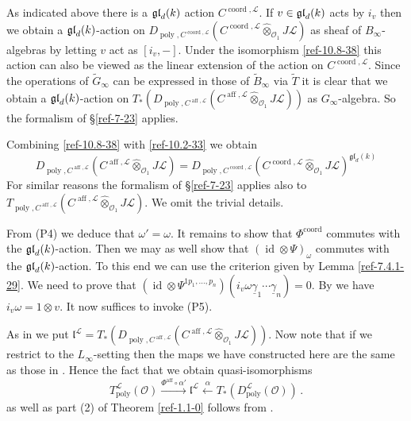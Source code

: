 \documentclass{amsart}
\numberwithin{equation}{section}
\let\cal\mathcal
\theoremstyle{definition}
\theoremstyle{remark}
\begin{document}
As indicated above there is a $\frak{gl}_d(k)$ action
$C^{{\operatorname{coord}},{{\cal L}}}$.  If $v\in \frak{gl}_d(k)$ acts by $i_v$ then we
obtain a $ \frak{gl}_d(k)$-action on $D_{{\operatorname{poly}},C^{{\operatorname{coord}},{{\cal L}}}}
(C^{{\operatorname{coord}},{{\cal L}}}{\mathbin{\hat{\otimes}}}_{{{\cal O}}_1} J{{\cal L}})$ as sheaf of
$B_\infty$-algebras by letting $v$ act as $[i_v,-]$. Under the
isomorphism \eqref{ref-10.8-38} this action can also be viewed as the
linear extension of the action on $C^{{\operatorname{coord}},{{\cal L}}}$.  Since the
operations of $\widetilde{G}_\infty$ can be expressed in those of
$\widetilde{B}_\infty$ via $\tilde{T}$ it is clear that we obtain a $
\frak{gl}_d(k)$-action on $ T_\ast(D_{{\operatorname{poly}},C^{{\operatorname{aff}},{{\cal L}}}}
(C^{{\operatorname{aff}},{{\cal L}}}{\mathbin{\hat{\otimes}}}_{{{\cal O}}_1} J{{\cal L}}))$ as $G_\infty$-algebra.  So
the formalism of \S\ref{ref-7-23} applies.

Combining \eqref{ref-10.8-38} with \eqref{ref-10.2-33} we obtain
\[
D_{{\operatorname{poly}},C^{{\operatorname{aff}},{{\cal L}}}} (C^{{\operatorname{aff}},{{\cal L}}}{\mathbin{\hat{\otimes}}}_{{{\cal O}}_1} J{{\cal L}})=
D_{{\operatorname{poly}},C^{{\operatorname{coord}},{{\cal L}}}} (C^{{\operatorname{coord}},{{\cal L}}}{\mathbin{\hat{\otimes}}}_{{{\cal O}}_1} J{{\cal L}})^{\mathfrak{gl}_d(k)}
\]
For similar reasons the formalism of \S\ref{ref-7-23} applies
also to $T_{{\operatorname{poly}},C^{{\operatorname{aff}},{{\cal L}}}} (C^{{\operatorname{aff}},{{\cal L}}}{\mathbin{\hat{\otimes}}}_{{{\cal O}}_1}
J{{\cal L}})$. We omit the trivial details. 

From (P4) we deduce that $\omega'=\omega$. It remains to show that
$\Phi^{\operatorname{coord}}$ commutes with the $\frak{gl}_d(k)$-action.  Then we
may as well show that $({\operatorname{id}}\otimes\Psi)_\omega$ commutes with the
$\frak{gl}_d(k)$-action. To this end we can use the criterion given by
Lemma \ref{ref-7.4.1-29}. We need to prove that $({\operatorname{id}}\otimes
\Psi^{1p_1,\dots,p_n})(i_v\omega \underline{\gamma}_1\cdots\underline{\gamma}_n)=0$. 
By \cite[Lemma 5.2.1]{vdbcalaque} we have
$i_v\omega=1\otimes v$.  It now suffices to invoke (P5). 

As in \cite{vdbcalaque} we put
$\mathfrak{l}^{{\cal L}}=T_\ast(D_{{\operatorname{poly}},C^{{\operatorname{aff}},{{\cal L}}}}
(C^{{\operatorname{aff}},{{\cal L}}}{\mathbin{\hat{\otimes}}}_{{{\cal O}}_1} J{{\cal L}}))$.  Now note that if we
restrict to the $L_\infty$-setting then the maps we have constructed
here are the same as those in \cite{vdbcalaque}. Hence the fact
that we obtain quasi-isomorphisms 
\[
T_{\operatorname{poly}}^{{\cal L}}({{\cal O}})\xrightarrow{\Phi^{\operatorname{aff}}\circ\alpha'}\mathfrak{l}^{{\cal L}}
\xleftarrow{\alpha} T_\ast(D_{\operatorname{poly}}^{{\cal L}}({{\cal O}}))\,.
\]
as well as part (2) of Theorem \ref{ref-1.1-0} follows from \cite[Thm 7.4.1]{vdbcalaque}.
\appendix
\end{document}
